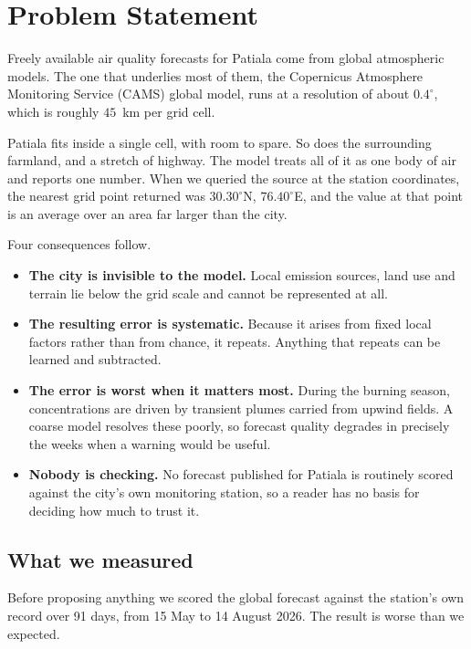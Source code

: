 \documentclass[11pt,a4paper]{article}
\newcommand{\NDays}{91}
\begin{document}
\section{Problem Statement}
Freely available air quality forecasts for Patiala come
from global atmospheric models. The one that underlies
most of them, the Copernicus Atmosphere Monitoring
Service (CAMS) global model, runs at a resolution of
about $0.4^\circ$, which is roughly $45$~km per grid
cell.

Patiala fits inside a single cell, with room to spare.
So does the surrounding farmland, and a stretch of
highway. The model treats all of it as one body of air
and reports one number. When we queried the source at
the station coordinates, the nearest grid point returned
was $30.30^\circ$N, $76.40^\circ$E, and the value at
that point is an average over an area far larger than
the city.

Four consequences follow.

\begin{itemize}[leftmargin=0.7cm]
  \item \textbf{The city is invisible to the model.}
    Local emission sources, land use and terrain lie
    below the grid scale and cannot be represented at
    all.
  \item \textbf{The resulting error is systematic.}
    Because it arises from fixed local factors rather
    than from chance, it repeats. Anything that repeats
    can be learned and subtracted.
  \item \textbf{The error is worst when it matters
    most.} During the burning season, concentrations are
    driven by transient plumes carried from upwind
    fields. A coarse model resolves these poorly, so
    forecast quality degrades in precisely the weeks
    when a warning would be useful.
  \item \textbf{Nobody is checking.} No forecast
    published for Patiala is routinely scored against
    the city's own monitoring station, so a reader has
    no basis for deciding how much to trust it.
\end{itemize}

\subsection{What we measured}
Before proposing anything we scored the global forecast against
the station's own record over \NDays{} days, from 15 May to 14
August 2026. The result is worse than we expected.
\end{document}
